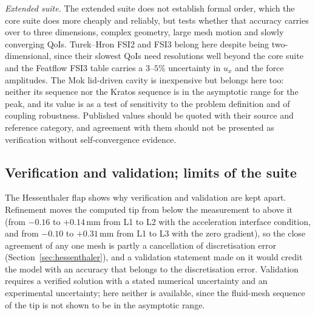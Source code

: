 \emph{Extended suite.}\label{sec:extended_suite}
The extended suite does not establish formal order, which the core suite does more cheaply and reliably, but tests whether that accuracy carries over to three dimensions, complex geometry, large mesh motion and slowly converging QoIs.
Turek--Hron FSI2 and FSI3 belong here despite being two-dimensional, since their slowest QoIs need resolutions well beyond the core suite and the Featflow FSI3 table carries a $3$--$5\%$ uncertainty in $u_x$ and the force amplitudes.
The Mok lid-driven cavity is inexpensive but belongs here too: neither its sequence nor the Kratos sequence is in the asymptotic range for the peak, and its value is as a test of sensitivity to the problem definition and of coupling robustness.
Published values should be quoted with their source and reference category, and agreement with them should not be presented as verification without self-convergence evidence.

\subsection{Verification and validation; limits of the suite}\label{sec:limits}

The Hessenthaler flap shows why verification and validation are kept apart.
Refinement moves the computed tip from below the measurement to above it (from $-0.16$ to $+0.14\,\mathrm{mm}$ from L1 to L2 with the acceleration interface condition, and from $-0.10$ to $+0.31\,\mathrm{mm}$ from L1 to L3 with the zero gradient), so the close agreement of any one mesh is partly a cancellation of discretisation error (Section~\ref{sec:hessenthaler}), and a validation statement made on it would credit the model with an accuracy that belongs to the discretisation error.
Validation requires a verified solution with a stated numerical uncertainty and an experimental uncertainty; here neither is available, since the fluid-mesh sequence of the tip is not shown to be in the asymptotic range.

